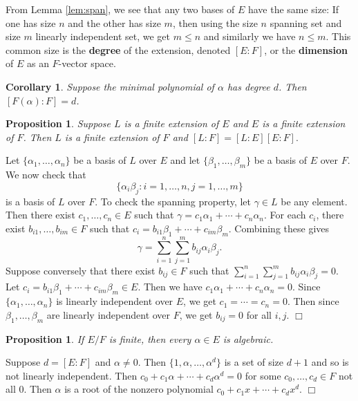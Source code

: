 \documentclass{article}
\newtheorem{cor}[subsection]{Corollary}
\newtheorem{proposition}[subsection]{Proposition}
\newenvironment{proof}{\noindent {\bf Proof:}}{$\Box$ \vspace{2 ex}}
\begin{document}
From Lemma \ref{lem:span}, we see that any two bases of $E$ have the same size: If one has size $n$ and the other has size $m$, then using the size $n$ spanning set and size $m$ linearly independent set, we get $m\leq n$ and similarly we have $n\leq m$. This common size is the \textbf{degree} of the extension, denoted $[E:F]$, or the \textbf{dimension} of $E$ as an $F$-vector space.

\begin{cor}\label{cor:Falpha}
    Suppose the minimal polynomial of $\alpha$ has degree $d$. Then $[F(\alpha):F] = d$.
\end{cor}



\begin{proposition}\label{prop:LEF}
    Suppose $L$ is a finite extension of $E$ and $E$ is a finite extension of $F$. Then $L$ is a finite extension of $F$ and $[L:F] = [L:E][E:F].$
\end{proposition}

\begin{proof}
    Let $\{\alpha_1,\ldots,\alpha_n\}$ be a basis of $L$ over $E$ and let $\{\beta_1,\ldots,\beta_m\}$ be a basis of $E$ over $F$. We now check that $$\{\alpha_i\beta_j\colon i = 1,\ldots,n, j = 1,\ldots,m\}$$ is a basis of $L$ over $F$. To check the spanning property, let $\gamma\in L$ be any element. Then there exist $c_1,\ldots,c_n\in E$ such that $\gamma = c_1\alpha_1 + \cdots + c_n\alpha_n$. For each $c_i$, there exist $b_{i1},\ldots,b_{im}\in F$ such that $c_i = b_{i1}\beta_1 + \cdots + c_{im}\beta_m.$ Combining these gives
    $$\gamma = \sum_{i=1}^n\sum_{j=1}^m b_{ij}\alpha_i\beta_j.$$
    Suppose conversely that there exist $b_{ij}\in F$ such that $\sum_{i=1}^n\sum_{j=1}^m b_{ij}\alpha_i\beta_j = 0.$ Let $c_i = b_{i1}\beta_1 + \cdots + c_{im}\beta_m \in E$. Then we have $c_1\alpha_1 + \cdots + c_n\alpha_n = 0$. Since $\{\alpha_1,\ldots,\alpha_n\}$ is linearly independent over $E$, we get $c_1 = \cdots = c_n = 0$. Then since $\beta_1,\ldots,\beta_m$ are linearly independent over $F$, we get $b_{ij} = 0$ for all $i,j$.
\end{proof}

\begin{proposition}
    If $E/F$ is finite, then every $\alpha\in E$ is algebraic.
\end{proposition}

\begin{proof}
    Suppose $d = [E:F]$ and $\alpha\neq 0$. Then $\{1,\alpha,\ldots,\alpha^d\}$ is a set of size $d+1$ and so is not linearly independent. Then $c_0 + c_1\alpha + \cdots + c_d\alpha^d = 0$ for some $c_0,\ldots,c_d\in F$ not all $0$. Then $\alpha$ is a root of the nonzero polynomial $c_0 + c_1x + \cdots + c_dx^d$.
\end{proof}
\end{document}
